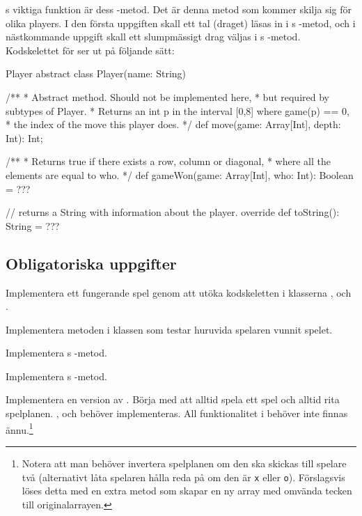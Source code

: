 s viktiga funktion är dess -metod. Det är denna metod som kommer skilja sig för olika players. I den första uppgiften skall ett tal (draget) läsas in i s -metod, och i nästkommande uppgift skall ett slumpmässigt drag väljas i s -metod.
Kodskelettet för  ser ut på följande sätt:
\begin{ScalaSpec}{Player}
abstract class Player(name: String) {

	/**
	 * Abstract method. Should not be implemented here,
	 * but required by subtypes of Player.
	 * Returns an int p in the interval [0,8] where game(p) == 0,
	 * the index of the move this player does.
	 */
	def move(game: Array[Int], depth: Int): Int;

	/**
	 * Returns true if there exists a row, column or diagonal,
	 * where all the elements are equal to who.
	 */
	def gameWon(game: Array[Int], who: Int): Boolean = ???

	// returns a String with information about the player.
	override def toString(): String = ???
}
\end{ScalaSpec}


\subsection{Obligatoriska uppgifter}

\Task Implementera ett fungerande spel genom att utöka kodskeletten i klasserna ,  och .

\Subtask Implementera metoden  i klassen  som testar huruvida spelaren  vunnit spelet.

\Subtask Implementera s -metod.

\Subtask Implementera s -metod.

\Subtask Implementera en version av . Börja med att alltid spela ett spel och alltid rita spelplanen. ,  och  behöver implementeras. All funktionalitet i  behöver inte finnas ännu.\footnote{Notera att man behöver invertera spelplanen om den ska skickas till spelare två (alternativt låta spelaren hålla reda på om den är \texttt{x} eller \texttt{o}). Förslagsvis löses detta med en extra metod  som skapar en ny array med omvända tecken till originalarrayen.}

\Task {}

